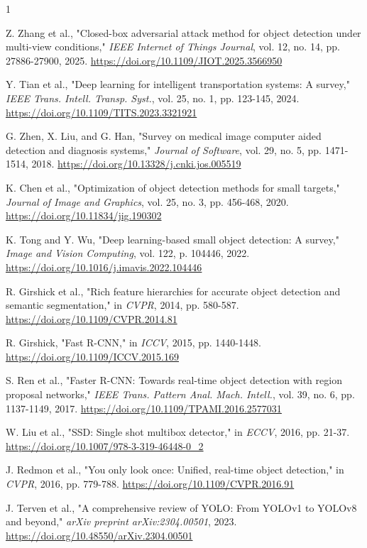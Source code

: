 \documentclass[lettersize,journal]{IEEEtran}
\begin{document}
\begin{thebibliography}{1}


 Z. Zhang et al., "Closed-box adversarial attack method for object detection under multi-view conditions," \textit{IEEE Internet of Things Journal}, vol. 12, no. 14, pp. 27886-27900, 2025. \url{https://doi.org/10.1109/JIOT.2025.3566950}

 Y. Tian et al., "Deep learning for intelligent transportation systems: A survey," \textit{IEEE Trans. Intell. Transp. Syst.}, vol. 25, no. 1, pp. 123-145, 2024. \url{https://doi.org/10.1109/TITS.2023.3321921}

 G. Zhen, X. Liu, and G. Han, "Survey on medical image computer aided detection and diagnosis systems," \textit{Journal of Software}, vol. 29, no. 5, pp. 1471-1514, 2018. \url{https://doi.org/10.13328/j.cnki.jos.005519}

 K. Chen et al., "Optimization of object detection methods for small targets," \textit{Journal of Image and Graphics}, vol. 25, no. 3, pp. 456-468, 2020. \url{https://doi.org/10.11834/jig.190302}

 K. Tong and Y. Wu, "Deep learning-based small object detection: A survey," \textit{Image and Vision Computing}, vol. 122, p. 104446, 2022. \url{https://doi.org/10.1016/j.imavis.2022.104446}

 R. Girshick et al., "Rich feature hierarchies for accurate object detection and semantic segmentation," in \textit{CVPR}, 2014, pp. 580-587. \url{https://doi.org/10.1109/CVPR.2014.81}

 R. Girshick, "Fast R-CNN," in \textit{ICCV}, 2015, pp. 1440-1448. \url{https://doi.org/10.1109/ICCV.2015.169}

 S. Ren et al., "Faster R-CNN: Towards real-time object detection with region proposal networks," \textit{IEEE Trans. Pattern Anal. Mach. Intell.}, vol. 39, no. 6, pp. 1137-1149, 2017. \url{https://doi.org/10.1109/TPAMI.2016.2577031}

 W. Liu et al., "SSD: Single shot multibox detector," in \textit{ECCV}, 2016, pp. 21-37. \url{https://doi.org/10.1007/978-3-319-46448-0_2}

 J. Redmon et al., "You only look once: Unified, real-time object detection," in \textit{CVPR}, 2016, pp. 779-788. \url{https://doi.org/10.1109/CVPR.2016.91}

 J. Terven et al., "A comprehensive review of YOLO: From YOLOv1 to YOLOv8 and beyond," \textit{arXiv preprint arXiv:2304.00501}, 2023. \url{https://doi.org/10.48550/arXiv.2304.00501}


\end{thebibliography}
\end{document}
